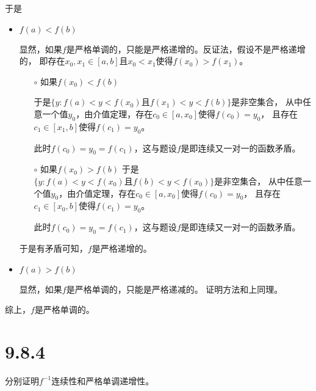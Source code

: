 \documentclass{article}
\begin{document}
于是
\begin{itemize}
  \item $f(a) < f(b)$

        显然，如果$f$是严格单调的，只能是严格递增的。反证法，假设不是严格递增的，
        即存在$x_0, x_1 \in [a,b]$且$x_0 < x_1$使得$f(x_0) > f(x_1)$。

        \begin{itemize}
          \item[$\circ$]如果$f(x_0) < f(b)$

                于是$\{y : f(a) < y < f(x_0) \text{且} f(x_1) < y < f(b) \}$是非空集合，
                从中任意一个值$y_0$，由介值定理，存在$c_0 \in [a, x_0]$使得$f(c_0) = y_0$，
                且存在$c_1 \in [x_1, b]$使得$f(c_1) = y_0$。

                此时$f(c_0) = y_0 = f(c_1)$，这与题设$f$是即连续又一对一的函数矛盾。

          \item[$\circ$]如果$f(x_0) > f(b)$
                于是$\{y : f(a) < y < f(x_0) \text{且} f(b) < y < f(x_0) \}$是非空集合，
                从中任意一个值$y_0$，由介值定理，存在$c_0 \in [a, x_0]$使得$f(c_0) = y_0$，
                且存在$c_1 \in [x_0, b]$使得$f(c_1) = y_0$。

                此时$f(c_0) = y_0 = f(c_1)$，这与题设$f$是即连续又一对一的函数矛盾。
        \end{itemize}

        于是有矛盾可知，$f$是严格递增的。

  \item $f(a) > f(b)$

        显然，如果$f$是严格单调的，只能是严格递减的。
        证明方法和上同理。
\end{itemize}

综上，$f$是严格单调的。

\section*{9.8.4}

分别证明$f^{-1}$连续性和严格单调递增性。
\end{document}
